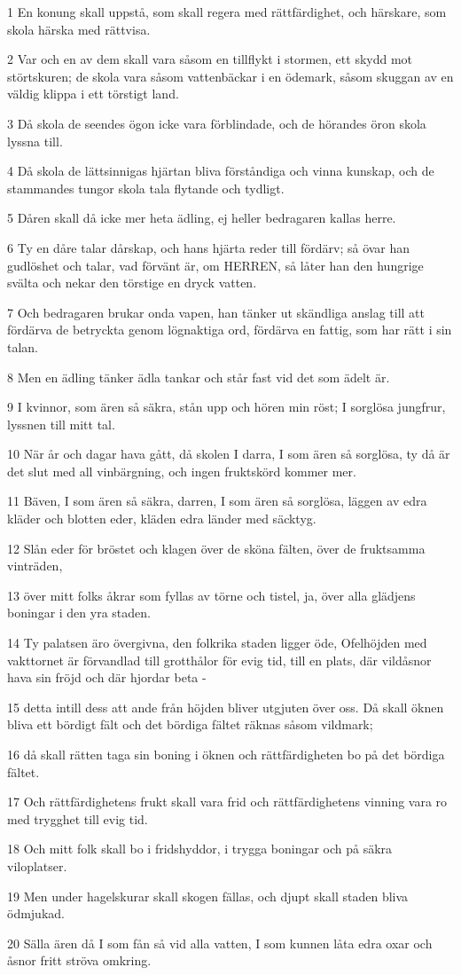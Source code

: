\par 1 En konung skall uppstå, som skall regera med rättfärdighet, och härskare, som skola härska med rättvisa.
\par 2 Var och en av dem skall vara såsom en tillflykt i stormen, ett skydd mot störtskuren; de skola vara såsom vattenbäckar i en ödemark, såsom skuggan av en väldig klippa i ett törstigt land.
\par 3 Då skola de seendes ögon icke vara förblindade, och de hörandes öron skola lyssna till.
\par 4 Då skola de lättsinnigas hjärtan bliva förståndiga och vinna kunskap, och de stammandes tungor skola tala flytande och tydligt.
\par 5 Dåren skall då icke mer heta ädling, ej heller bedragaren kallas herre.
\par 6 Ty en dåre talar dårskap, och hans hjärta reder till fördärv; så övar han gudlöshet och talar, vad förvänt är, om HERREN, så låter han den hungrige svälta och nekar den törstige en dryck vatten.
\par 7 Och bedragaren brukar onda vapen, han tänker ut skändliga anslag till att fördärva de betryckta genom lögnaktiga ord, fördärva en fattig, som har rätt i sin talan.
\par 8 Men en ädling tänker ädla tankar och står fast vid det som ädelt är.
\par 9 I kvinnor, som ären så säkra, stån upp och hören min röst; I sorglösa jungfrur, lyssnen till mitt tal.
\par 10 När år och dagar hava gått, då skolen I darra, I som ären så sorglösa, ty då är det slut med all vinbärgning, och ingen fruktskörd kommer mer.
\par 11 Bäven, I som ären så säkra, darren, I som ären så sorglösa, läggen av edra kläder och blotten eder, kläden edra länder med säcktyg.
\par 12 Slån eder för bröstet och klagen över de sköna fälten, över de fruktsamma vinträden,
\par 13 över mitt folks åkrar som fyllas av törne och tistel, ja, över alla glädjens boningar i den yra staden.
\par 14 Ty palatsen äro övergivna, den folkrika staden ligger öde, Ofelhöjden med vakttornet är förvandlad till grotthålor för evig tid, till en plats, där vildåsnor hava sin fröjd och där hjordar beta -
\par 15 detta intill dess att ande från höjden bliver utgjuten över oss. Då skall öknen bliva ett bördigt fält och det bördiga fältet räknas såsom vildmark;
\par 16 då skall rätten taga sin boning i öknen och rättfärdigheten bo på det bördiga fältet.
\par 17 Och rättfärdighetens frukt skall vara frid och rättfärdighetens vinning vara ro med trygghet till evig tid.
\par 18 Och mitt folk skall bo i fridshyddor, i trygga boningar och på säkra viloplatser.
\par 19 Men under hagelskurar skall skogen fällas, och djupt skall staden bliva ödmjukad.
\par 20 Sälla ären då I som fån så vid alla vatten, I som kunnen låta edra oxar och åsnor fritt ströva omkring.

